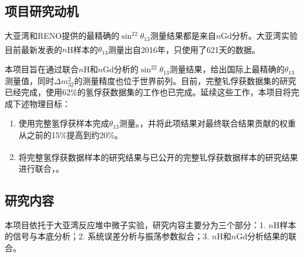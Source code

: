 \documentclass[a4paper,zihao=-4]{article}
\newcommand{\citess}[1]{\textsuperscript{\cite{#1}}}
\begin{document}
\subsection{项目研究动机}
大亚湾和RENO提供的最精确的$\sin^22\theta_{13}$测量结果都是来自$n$Gd分析。大亚湾实验目前最新发表的$n$H样本的$\theta_{13}$测量\citess{DayaBay:2016ziq}出自2016年，只使用了621天的数据。

本项目旨在通过联合$n$H和$n$Gd分析的$\sin^22\theta_{13}$测量结果，给出国际上最精确的$\theta_{13}$测量值，同时$\Delta m_{32}^2$的测量精度也位于世界前列。目前，完整钆俘获数据集的研究已经完成，使用62\%的氢俘获数据集的工作也已完成。延续这些工作，本项目将完成下述物理目标：
\begin{enumerate}
	\item 使用完整氢俘获样本完成$\theta_{13}$测量。，并将此项结果对最终联合结果贡献的权重从之前的15\%提高到约20\%。
	\item 将完整氢俘获数据样本的研究结果与已公开的完整钆俘获数据样本的研究结果\citess{DayaBay:2022orm}进行联合，。
\end{enumerate}

\begin{spacing}{1.3} %
	 \songti   
	
	  
	\vspace{11bp}
\end{spacing}

\subsection{研究内容}

本项目依托于大亚湾反应堆中微子实验，研究内容主要分为三个部分：1. $n$H样本的信号与本底分析；2. 系统误差分析与振荡参数拟合；3. $n$H和$n$Gd分析结果的联合。
\end{document}
